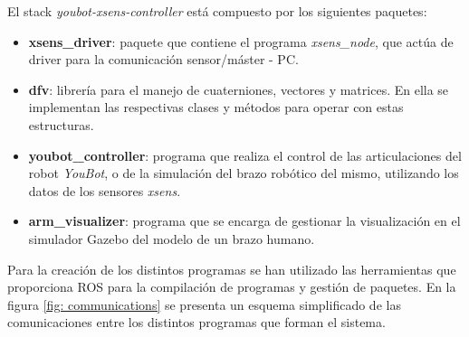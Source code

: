 \documentclass[12pt, a4paper]{report}
\begin{document}
El stack \textit{youbot-xsens-controller} está compuesto por los siguientes paquetes:

\begin{itemize}

\item \textbf{xsens\_driver}: paquete que contiene el programa \textit{xsens\_node}, que actúa de driver para la comunicación sensor/máster - PC.

\item \textbf{dfv}: librería para el manejo de cuaterniones, vectores y matrices. En ella se implementan las respectivas clases y métodos para operar con estas estructuras.

\item \textbf{youbot\_controller}: programa que realiza el control de las articulaciones del robot \textit{YouBot}, o de la simulación del brazo robótico del mismo, utilizando los datos de los sensores \textit{xsens}.

\item \textbf{arm\_visualizer}: programa que se encarga de gestionar la visualización en el simulador Gazebo del modelo de un brazo humano.

\end{itemize}

Para la creación de los distintos programas se han utilizado las herramientas que proporciona ROS para la compilación de programas y gestión de paquetes. En la figura \ref{fig: communications} se presenta un esquema simplificado de las comunicaciones entre los distintos programas que forman el sistema.
\end{document}
